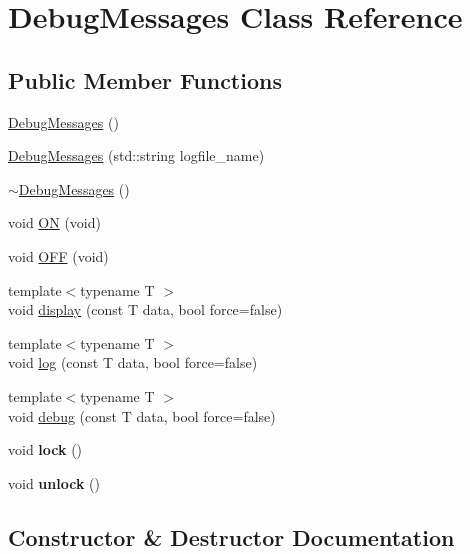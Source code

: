 \hypertarget{classDebugMessages}{}\section{Debug\+Messages Class Reference}
\label{classDebugMessages}
\subsection*{Public Member Functions}
\begin{DoxyCompactItemize}
\item 
\mbox{\hyperlink{classDebugMessages_a7fb2c5a7cce97eb05661b1f6657cb650}{Debug\+Messages}} ()
\item 
\mbox{\hyperlink{classDebugMessages_aa60430ca0e05e43a8bb27f4cdc1a158c}{Debug\+Messages}} (std\+::string logfile\+\_\+name)
\item 
\mbox{\hyperlink{classDebugMessages_a3700e476ad70d27ba14be67b43ff6f69}{$\sim$\+Debug\+Messages}} ()
\item 
void \mbox{\hyperlink{classDebugMessages_a95866775dcf301773daa7bed529c557e}{ON}} (void)
\item 
void \mbox{\hyperlink{classDebugMessages_ac1e4085ade0d1ff7b603fd8205f74b7c}{O\+FF}} (void)
\item 
{\footnotesize template$<$typename T $>$ }\\void \mbox{\hyperlink{classDebugMessages_a09343725fb16b9e9d3c5587880e8401e}{display}} (const T data, bool force=false)
\item 
{\footnotesize template$<$typename T $>$ }\\void \mbox{\hyperlink{classDebugMessages_a6b7e8eb509b3d0903e918ae25dec18aa}{log}} (const T data, bool force=false)
\item 
{\footnotesize template$<$typename T $>$ }\\void \mbox{\hyperlink{classDebugMessages_aac71fdadaf41ce9a3dd7dd502096fb51}{debug}} (const T data, bool force=false)
\item 
\mbox{\label{classDebugMessages_abb8c29cf2e650f04b45edf0087b47d81}} 
void {\bfseries lock} ()
\item 
\mbox{\label{classDebugMessages_a575b874fbfdadaf91eaa7ec4599c78e3}} 
void {\bfseries unlock} ()
\end{DoxyCompactItemize}


\subsection{Constructor \& Destructor Documentation}
\mbox{\label{classDebugMessages_a7fb2c5a7cce97eb05661b1f6657cb650}} 
